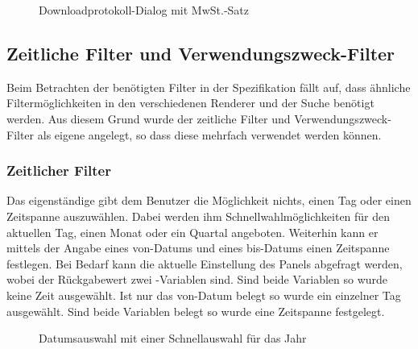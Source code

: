 \begin{figure}[htb]
	\centering
	\caption{Downloadprotokoll-Dialog mit MwSt.-Satz}
	\label{fig:alkis-protocol-new}
\end{figure}

\subsection{Zeitliche Filter und Verwendungszweck-Filter}
Beim Betrachten der benötigten Filter in der Spezifikation fällt auf, dass ähnliche Filtermöglichkeiten in den verschiedenen Renderer und der Suche benötigt werden. Aus diesem Grund wurde der zeitliche Filter und Verwendungszweck-Filter als eigene  angelegt, so dass diese mehrfach verwendet werden können.

\subsubsection{Zeitlicher Filter}
Das eigenständige   gibt dem Benutzer die Möglichkeit nichts, einen Tag oder einen Zeitspanne auszuwählen.
Dabei werden ihm Schnellwahlmöglichkeiten für den aktuellen Tag, einen Monat oder ein Quartal angeboten.
Weiterhin kann er mittels der Angabe eines von-Datums und eines bis-Datums einen Zeitspanne festlegen.
Bei Bedarf kann die aktuelle Einstellung des Panels abgefragt werden, wobei der Rückgabewert zwei -Variablen sind.
Sind beide Variablen  so wurde keine Zeit ausgewählt.
Ist nur das von-Datum belegt so wurde ein einzelner Tag ausgewählt.
Sind beide Variablen belegt so wurde eine Zeitspanne festgelegt.

\begin{figure}[htb]
	\centering
	\caption{Datumsauswahl mit einer Schnellauswahl für das Jahr}
	\label{fig:jxdatepicker}
\end{figure}

